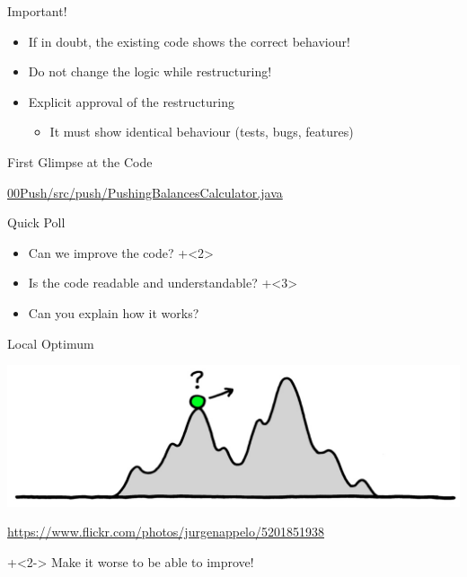 \begin{frame}[fragile]{Important!}
\begin{itemize}
\item If in doubt, the existing code shows the correct behaviour!

\item Do not change the logic while restructuring!

\item Explicit approval of the restructuring
\begin{itemize}
\item It must show identical behaviour (tests, bugs, features)
\end{itemize}

\end{itemize}
\end{frame}

\begin{frame}[fragile]{First Glimpse at the Code}

\begin{center}
{\large \url{00Push/src/push/PushingBalancesCalculator.java}}
\end{center}
\end{frame}

\begin{frame}[fragile]{Quick Poll}

\begin{itemize}
\onslide+<1>
\item Can we improve the code?
\onslide+<2>
\item Is the code readable and understandable?
\onslide+<3>
\item Can you explain how it works?
\end{itemize}

\end{frame}

\begin{frame}[fragile]{Local Optimum}

{
\begin{center}
\includegraphics[width=\textwidth]{LocalOptimum.jpg}
\end{center}
\vspace{-1.7em}
\hfill \tiny{\url{https://www.flickr.com/photos/jurgenappelo/5201851938}}
}

\onslide+<2->
\vspace{2em}
Make it worse to be able to improve!

\end{frame}

